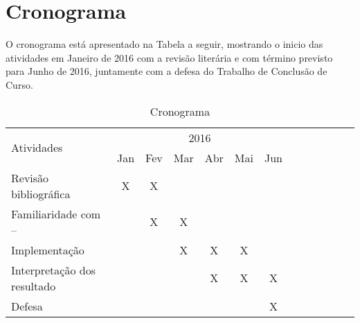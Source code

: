 \chapter{Cronograma}

\indent O cronograma está apresentado na Tabela a seguir, mostrando o inicio das atividades em Janeiro de 2016 com 
a revisão literária e com término previsto para Junho de 2016, juntamente com a defesa do Trabalho de Conclusão de Curso. 


\begin{table}[h!]
\centering
\caption{Cronograma}
\begin{tabular}{|l|c|c|c|c|c|c|c|c|c|c|c|c|}
\hline
 \multirow{2}{*}{Atividades} & \multicolumn{6}{|c|}{2016} \\ \cline{2-7}
 & Jan & Fev & Mar & Abr & Mai & Jun  \\ \hline
Revisão bibliográfica & X & X &  &  &  &    \\ \hline
Familiaridade com -- &  & X & X &  &  &   \\ \hline
Implementação &  &  & X & X & X &   \\ \hline
Interpretação dos resultado &  &  &  & X & X & X  \\ \hline 
Defesa &  &  &  &  &  & X  \\ \hline
 
\end{tabular}
\end{table}
